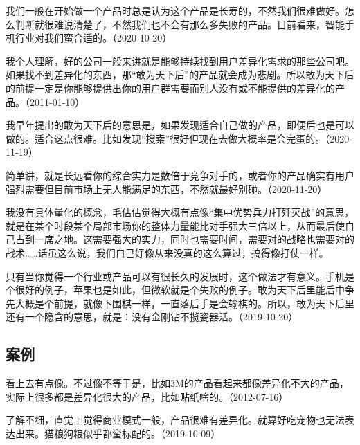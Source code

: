 我们一般在开始做一个产品时总是认为这个产品是长寿的，不然我们很难做好。怎么判断就很难说清楚了，不然我们也不会有那么多失败的产品。目前看来，智能手机行业对我们蛮合适的。（2020-10-20）


我个人理解，好的公司一般来讲就是能够持续找到用户差异化需求的那些公司吧。如果找不到差异化的东西，那“敢为天下后”的产品就会成为悲剧。所以敢为天下后的前提一定是你能够提供出你的用户群需要而别人没有或不能提供的差异化的产品。（2011-01-10）

我早年提出的敢为天下后的意思是，如果发现适合自己做的产品，即便后也是可以做的。适合这点很难。比如发现“搜索”很好但现在去做大概率是会完蛋的。（2020-11-19）


简单讲，就是长远看你的综合实力是数倍于竞争对手的，或者你的产品确实有用户强烈需要但目前市场上无人能满足的东西，不然就最好别碰。（2020-11-20）

我没有具体量化的概念，毛估估觉得大概有点像“集中优势兵力打歼灭战”的意思，就是在某个时段某个局部市场你的整体力量能比对手强大三倍以上，从而最后使自己占到一席之地。这需要强大的实力，同时也需要时间，需要对的战略也需要对的战术……话虽这么说，我们自己好像从来没真的这么算过，搞得像打仗一样。

只有当你觉得一个行业或产品可以有很长久的发展时，这个做法才有意义。手机是个很好的例子，苹果也是如此，但微软就是个失败的例子。敢为天下后里能后中争先大概是个前提，就像下围棋一样，一直落后手是会输棋的。所以，敢为天下后里还有一个隐含的意思，就是：没有金刚钻不揽瓷器活。（2019-10-20）

\subsection{案例}


看上去有点像。不过像不等于是，比如3M的产品看起来都像差异化不大的产品，实际上很多都是差异化很大的产品，比如贴纸啥的。（2012-07-16）


了解不细，直觉上觉得商业模式一般，产品很难有差异化。就算好吃宠物也无法表达出来。猫粮狗粮似乎都蛮标配的。（2019-10-09）


